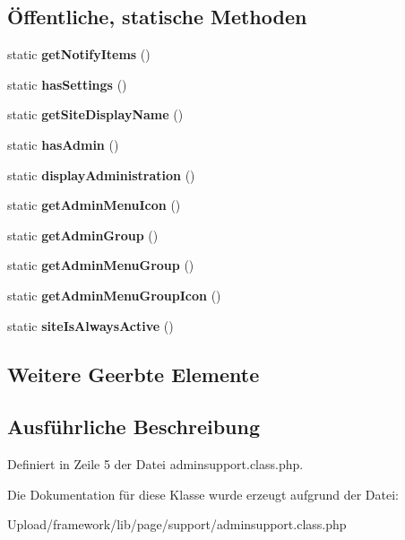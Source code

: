\subsection*{Öffentliche, statische Methoden}
\begin{DoxyCompactItemize}
\item 
\mbox{\label{classadminsupport_a526ecbf083413a9593fa88ff96ac94bd}} 
static {\bfseries get\+Notify\+Items} ()
\item 
\mbox{\label{classadminsupport_a1dd53a61d317648f9dacef4afda5ff97}} 
static {\bfseries has\+Settings} ()
\item 
\mbox{\label{classadminsupport_a1df335a7ca868af9c3eea13e6d0c8028}} 
static {\bfseries get\+Site\+Display\+Name} ()
\item 
\mbox{\label{classadminsupport_ab9534ae4b7a5a366d0797eb8ba23d0f8}} 
static {\bfseries has\+Admin} ()
\item 
\mbox{\label{classadminsupport_aa02990d242413b4790d846762b5d21b6}} 
static {\bfseries display\+Administration} ()
\item 
\mbox{\label{classadminsupport_a17d10fe6a70e0dce18cd62835593b3a7}} 
static {\bfseries get\+Admin\+Menu\+Icon} ()
\item 
\mbox{\label{classadminsupport_a50201de35fe760dab41541ce15b89059}} 
static {\bfseries get\+Admin\+Group} ()
\item 
\mbox{\label{classadminsupport_a54ade96a55fdd6540301bec47410fa3c}} 
static {\bfseries get\+Admin\+Menu\+Group} ()
\item 
\mbox{\label{classadminsupport_a9aebf29c94eea008cb38201413a3ee41}} 
static {\bfseries get\+Admin\+Menu\+Group\+Icon} ()
\item 
\mbox{\label{classadminsupport_ab5e22a85feadff2cc44e352c8b38d473}} 
static {\bfseries site\+Is\+Always\+Active} ()
\end{DoxyCompactItemize}
\subsection*{Weitere Geerbte Elemente}


\subsection{Ausführliche Beschreibung}


Definiert in Zeile 5 der Datei adminsupport.\+class.\+php.



Die Dokumentation für diese Klasse wurde erzeugt aufgrund der Datei\+:\begin{DoxyCompactItemize}
\item 
Upload/framework/lib/page/support/adminsupport.\+class.\+php\end{DoxyCompactItemize}
